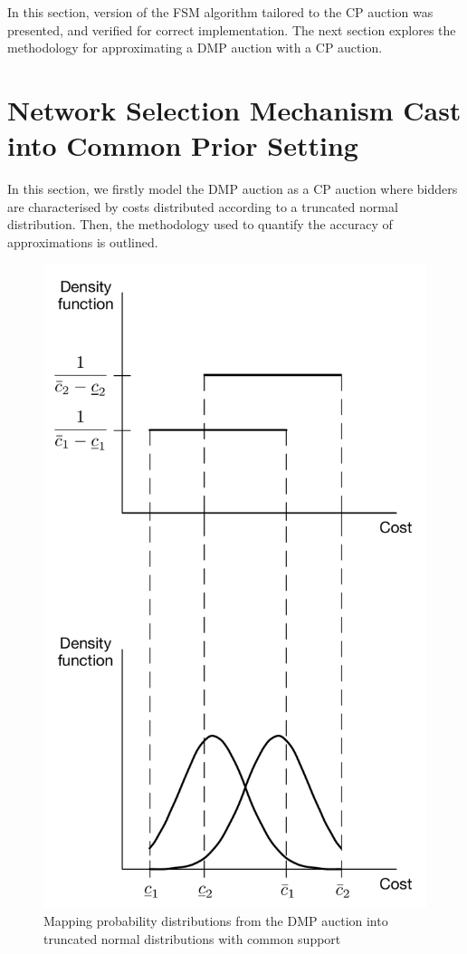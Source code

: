 
In this section, version of the FSM algorithm tailored to the CP auction was presented, and verified for correct implementation. The next section explores the methodology for approximating a DMP auction with a CP auction.

\section{Network Selection Mechanism Cast into Common Prior Setting} %
\label{sec:network_selection_mechanism_cast_into_common_priors_setting_approximation}
In this section, we firstly model the DMP auction as a CP auction where bidders are characterised by costs distributed according to a truncated normal distribution. Then, the methodology used to quantify the accuracy of approximations is outlined.

\begin{figure}[p!]
  \includegraphics[width=\figsize]{Approximation/Figures/dmp_to_common_priors}
  \caption{Mapping probability distributions from the DMP auction into truncated normal distributions with common support}
  \label{fig:dmp_to_common_priors_approximation}
\end{figure}


